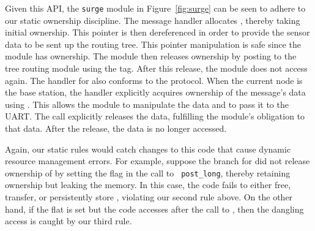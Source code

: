 Given this API, the {\tt surge} module in Figure~\ref{fig:surge} can be seen to
adhere to our static ownership discipline.  
The  message handler allocates ,
thereby taking initial 
ownership. This pointer is then dereferenced in order to provide the
sensor data to be sent up the routing tree.  This pointer manipulation
is safe since the module has ownership.  The module then releases
ownership by posting  to the tree routing module using the
 tag.  After this release, the module does not
access  again. 
The handler for  also conforms to the
protocol.   When the current node is the base station, the handler
explicitly acquires ownership of the message's data using
.  This allows the module to manipulate the data
and to pass it to the UART.  The  call explicitly
releases the data, fulfilling the module's obligation to that data.
After the release, the data is no longer accessed.

Again, our static rules would catch changes to this code that cause
dynamic resource management errors.
For example, suppose the branch for
 did not release ownership of  by
setting the  flag in the call to {\tt
post\_long}, thereby retaining ownership but leaking the memory.    
In this case,
the code fails to either free, transfer, or
persistently store , violating our second rule above.  On
the other hand, if the  flat is set but the
code accesses  after the call to , then the
dangling access is caught by our third rule.
 


